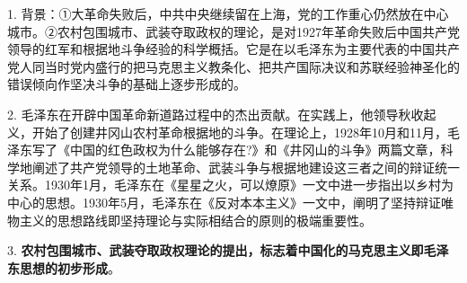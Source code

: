 1.
背景：①大革命失败后，中共中央继续留在上海，党的工作重心仍然放在中心城市。②农村包围城市、武装夺取政权的理论，是对1927年革命失败后中国共产党领导的红军和根据地斗争经验的科学概括。它是在以毛泽东为主要代表的中国共产党人同当时党内盛行的把马克思主义教条化、把共产国际决议和苏联经验神圣化的错误倾向作坚决斗争的基础上逐步形成的。

{2.
毛泽东在开辟中国革命新道路过程中的杰出贡献。在实践上，他领导秋收起义，开始了创建井冈山农村革命根据地的斗争。在理论上，1928年10月和11月，毛泽东写了}《中国的红色政权为什么能够存在?》和《井冈山的斗争》{两篇文章，科学地阐述了共产党领导的}土地革命、武装斗争与根据地建设{这三者之间的辩证统一关系。1930年1月，毛泽东在}《星星之火，可以燎原》{一文中进一步}指出以乡村为中心的思想{。1930年5月，毛泽东在}《反对本本主义》{一文中，}阐明了坚持辩证唯物主义的思想路线即坚持理论与实际相结合的原则的极端重要性{。}

{3.
}\textbf{农村包围城市、武装夺取政权理论的提出，标志着中国化的马克思主义即毛泽东思想的初步形成}{。}
